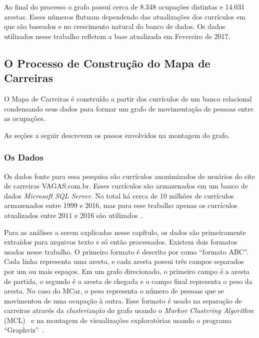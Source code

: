 \documentclass[12pt,a4paper]{article}
\theoremstyle{hypo}
\begin{document}
Ao final do processo o grafo possui cerca de 8.348 ocupações distintas e 14.031 arestas. Esses números flutuam dependendo das atualizações dos currículos em que são baseados e no crescimento natural do banco de dados. Os dados utilizados nesse trabalho refletem a base atualizada em Fevereiro de 2017.


\subsection{O Processo de Construção do Mapa de Carreiras} \label{sec:construcao}

O Mapa de Carreiras é construído a partir dos currículos de um banco relacional condensando seus dados para formar um grafo de movimentação de pessoas entre as ocupações.

As seções a seguir descrevem os passos envolvidos na montagem do grafo.

\subsubsection{Os Dados}

Os dados fonte para essa pesquisa são currículos anonimizados de usuários do site de carreiras VAGAS.com.br. Esses currículos são armazenados em um banco de dados \textit{Microsoft SQL Server}. No total há cerca de 10 milhões de currículos~ armazenados entre 1999 e 2016, mas para esse trabalho apenas os currículos atualizados entre 2011 e 2016 são utilizados~.


Para as análises a serem explicadas nesse capítulo, os dados são primeiramente extraídos para arquivos texto e só então processados. Existem dois formatos usados nesse trabalho. O primeiro formato é descrito por  como \enquote{formato ABC}. Cada linha representa uma aresta, e cada aresta possui três campos separados por um ou mais espaços. Em um grafo direcionado, o primeiro campo é a aresta de partida, o segundo é a aresta de chegada e o campo final representa o peso da aresta. No caso do MCar, o peso representa o número de pessoas que se movimentou de uma ocupação à outra. Esse formato é usado na separação de carreiras através da \textit{clusterização} do grafo usando o \textit{Markov Clustering Algorithm} (MCL)~\cite{Van_Dongen2000-qm} e na montagem de visualizações exploratórias usando o programa \enquote{Graphviz}~\cite{Gansner2000-oo}.
\end{document}
